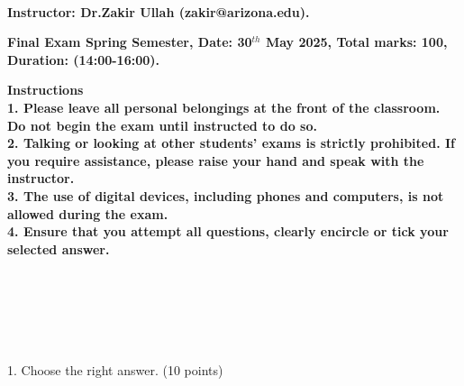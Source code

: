 \documentclass[6pt]{article}
\begin{document}
\Large
\begin{center}
\\
\vspace{40pt}
\bf Instructor: Dr.Zakir Ullah (zakir@arizona.edu).\\
\vspace{40pt}
\end {center}

\vspace{40pt}
\begin{center}

\bf Final Exam Spring Semester, Date: 30$^{th}$ May 2025, Total marks: 100, Duration: (14:00-16:00).
\end{center}
\vspace{5pt}
\vspace{20pt}

\bf Instructions \\
1. Please leave all personal belongings at the front of the classroom. Do not begin the exam until instructed to do so.\\
2. Talking or looking at other students' exams is strictly prohibited. If you require assistance, please raise your hand and speak with the instructor.\\
3. The use of digital devices, including phones and computers, is not allowed during the exam.\\
4. Ensure that you attempt all questions, clearly encircle or tick your selected answer.


\vspace{10pt}

\\
\vspace{10pt}

\\
\vspace{10pt}

\\

\vspace{100pt}
\large

1. Choose the right answer. (10 points)
\end{document}
